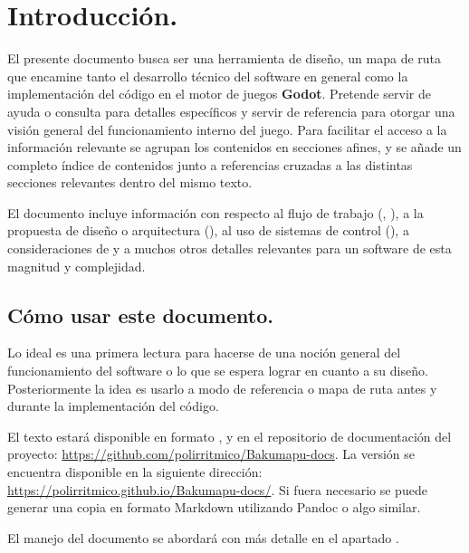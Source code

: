 
\section{Introducción.}\label{intro:introduccion}

El presente documento busca ser una herramienta de diseño, un mapa de ruta que encamine tanto el desarrollo técnico del software en general como la implementación del código en el motor de juegos \textbf{Godot}. Pretende servir de ayuda o consulta para detalles específicos y servir de referencia para otorgar una visión general del funcionamiento interno del juego. Para facilitar el acceso a la información relevante se agrupan los contenidos en secciones afines, y se añade un completo índice de contenidos junto a referencias cruzadas a las distintas secciones relevantes dentro del mismo texto.

El documento incluye información con respecto al flujo de trabajo (, ), a la propuesta de diseño o arquitectura (), al uso de sistemas de control  (), a consideraciones de  y a muchos otros detalles relevantes para un software de esta magnitud y complejidad.

\subsection{Cómo usar este documento.}\label{intro:como-usar-el-documento}
Lo ideal es una primera lectura para hacerse de una noción general del funcionamiento del software o lo que se espera lograr en cuanto a su diseño. Posteriormente la idea es usarlo a modo de referencia o mapa de ruta antes y durante la implementación del código.

El texto estará disponible en formato ,  y  en el repositorio de documentación del proyecto: \url{https://github.com/polirritmico/Bakumapu-docs}. La versión  se encuentra disponible en la siguiente dirección: \url{https://polirritmico.github.io/Bakumapu-docs/}. Si fuera necesario se puede generar una copia en formato Markdown utilizando Pandoc o algo similar.

El manejo del documento se abordará con más detalle en el apartado .

